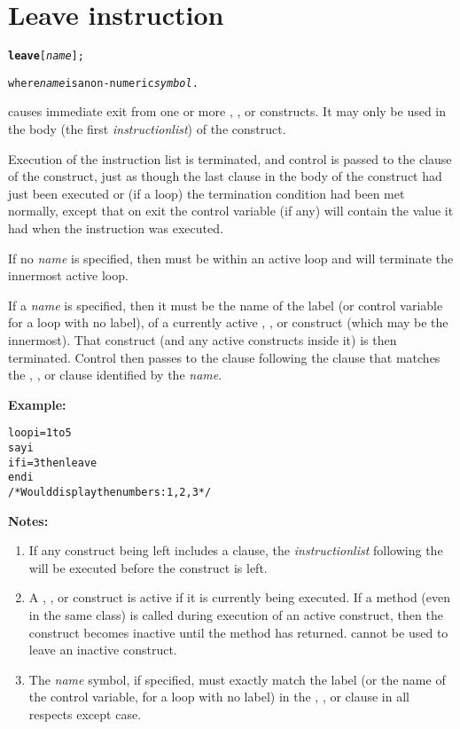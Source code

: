 \chapter{Leave instruction}\label{refleave}
\index{,}
\begin{shaded}
\begin{alltt}
\textbf{leave} [\emph{name}];

where \emph{name} is a non-numeric \emph{symbol}.
\end{alltt}
\end{shaded}
  causes immediate exit from one or more ,
, or  constructs.
It may only be used in the body (the first \emph{instructionlist})
of the construct.
 
Execution of the instruction list is terminated, and control is
passed to the  clause of the construct, just as though the
last clause in the body of the construct had just been executed or (if
a loop) the termination condition had been met normally, except that on
exit the control variable (if any) will contain the value it had when
the  instruction was executed.
 
If no \emph{name} is specified, then  must be
within an active loop and will terminate the innermost active loop.
 
If a \emph{name} is specified, then it must be the name of the
label (or control variable for a loop with no label), of a currently
active , , or  construct
(which may be the innermost).  That construct (and any active constructs
inside it) is then terminated.  Control then passes to the clause
following the  clause that matches the
, , or  clause identified by the
\emph{name}.

\textbf{Example:}
\begin{alltt}
loop i=1 to 5
  say i
  if i=3 then leave
  end i
/* Would display the numbers:  1, 2, 3  */
\end{alltt}
 \textbf{Notes:}
\begin{enumerate}
\item If any construct being left includes a  clause, the
\emph{instructionlist} following the  will be
executed before the construct is left.
\item 
A , , or  construct
is active if it is currently being executed.
If a method (even in the same class) is called during execution of an
active construct, then the construct becomes inactive until the method
has returned.
 cannot be used to leave an inactive construct.
\item The \emph{name} symbol, if specified, must exactly match the
label (or the name of the control variable, for a loop with no label) in
the , , or  clause in all
respects except case.
\end{enumerate}
